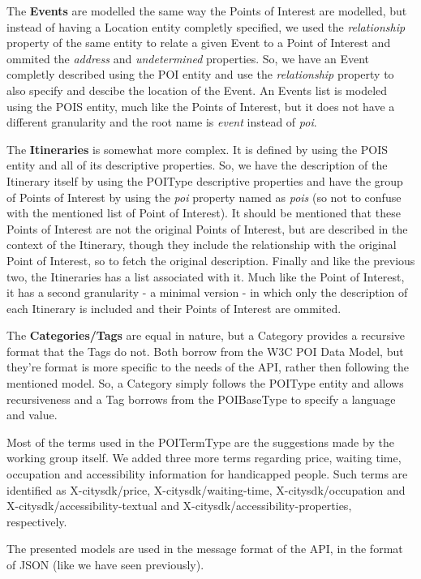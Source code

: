\documentclass[times]{ettauth}
\begin{document}
The \textbf{Events} are modelled the same way the Points of Interest are modelled, but instead of having a Location entity completly specified, we used the \textit{relationship} property of the same entity to relate a given Event to a Point of Interest and ommited the \textit{address} and \textit{undetermined} properties. So, we have an Event completly described using the POI entity and use the \textit{relationship} property to also specify and descibe the location of the Event. An Events list is modeled using the POIS entity, much like the Points of Interest, but it does not have a different granularity and the root name is \textit{event} instead of \textit{poi}.

The \textbf{Itineraries} is somewhat more complex. It is defined by using the POIS entity and all of its descriptive properties. So, we have the description of the Itinerary itself by using the POIType descriptive properties and have the group of Points of Interest by using the \textit{poi} property named as \textit{pois} (so not to confuse with the mentioned list of Point of Interest). It should be mentioned that these Points of Interest are not the original Points of Interest, but are described in the context of the Itinerary, though they include the relationship with the original Point of Interest, so to fetch the original description. Finally and like the previous two, the Itineraries has a list associated with it. Much like the Point of Interest, it has a second granularity - a minimal version - in which only the description of each Itinerary is included and their Points of Interest are ommited.

The \textbf{Categories/Tags} are equal in nature, but a Category provides a recursive format that the Tags do not. Both borrow from the W3C POI Data Model, but they're format is more specific to the needs of the API, rather then following the mentioned model. So, a Category simply follows the POIType entity and allows recursiveness and a Tag borrows from the POIBaseType to specify a language and value.

Most of the terms used in the POITermType are the suggestions made by the working group itself. We added three more terms regarding price, waiting time, occupation and accessibility information for handicapped people. Such terms are identified as X-citysdk/price, X-citysdk/waiting-time, X-citysdk/occupation and X-citysdk/accessibility-textual and X-citysdk/accessibility-properties, respectively.

The presented models are used in the message format of the API, in the format of \ac{JSON} (like we have seen previously).
\end{document}
